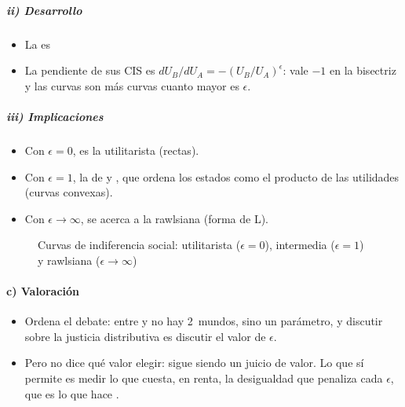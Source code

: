 \documentclass[11pt]{article}
\begin{document}
\subparagraph{ii) Desarrollo}

\begin{itemize}
\item La  es
\item La pendiente de sus CIS es $dU_B/dU_A=-(U_B/U_A)^{\epsilon}$: vale $-1$ en la bisectriz y las curvas son más curvas cuanto mayor es $\epsilon$.
\end{itemize}

\subparagraph{iii) Implicaciones}

\begin{itemize}
\item Con $\epsilon=0$, es la utilitarista (rectas).
\item Con $\epsilon=1$, la de  y , que ordena los estados como el producto de las utilidades (curvas convexas).
\item Con $\epsilon\to\infty$, se acerca a la rawlsiana (forma de L).
\end{itemize}

\begin{figure}[H]
\centering
\caption{Curvas de indiferencia social: utilitarista ($\epsilon=0$), intermedia ($\epsilon=1$) y rawlsiana ($\epsilon\to\infty$)}\label{fig:cis-formas}
\end{figure}

\paragraph{c) Valoración}

\begin{itemize}
\item Ordena el debate: entre  y  no hay 2~mundos, sino un parámetro, y discutir sobre la justicia distributiva es discutir el valor de $\epsilon$.
\item Pero no dice qué valor elegir: sigue siendo un juicio de valor. Lo que sí permite es medir lo que cuesta, en renta, la desigualdad que penaliza cada $\epsilon$, que es lo que hace .
\end{itemize}

\end{document}
